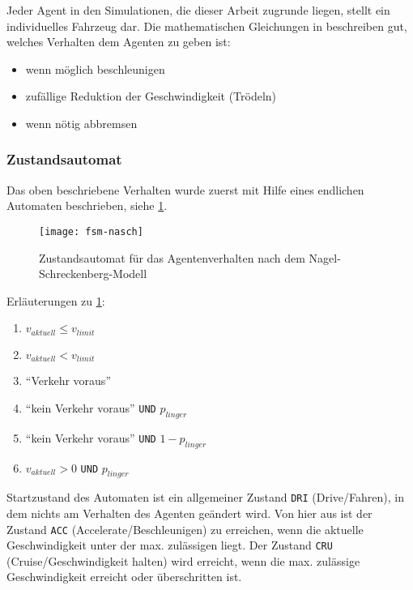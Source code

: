 Jeder Agent in den Simulationen, die dieser Arbeit zugrunde liegen, stellt ein individuelles Fahrzeug dar.
Die mathematischen Gleichungen in \cite{na-sch} beschreiben gut, welches Verhalten dem Agenten zu geben ist: 
\begin{itemize}
\itemsep0em
	\item wenn möglich beschleunigen
	\item zufällige Reduktion der Geschwindigkeit (Trödeln)
	\item wenn nötig abbremsen
\end{itemize}


\subsubsection{Zustandsautomat}

Das oben beschriebene Verhalten wurde zuerst mit Hilfe eines endlichen Automaten beschrieben, siehe \cref{figure:fsm-nasch}.

\begin{figure}[hptb]
 \centering
 \texttt{[image: fsm-nasch]}
 \caption[Zustandsautomat für das Agentenverhalten]
 		{Zustandsautomat für das Agentenverhalten nach dem Nagel-Schreckenberg-Modell}
 \label{figure:fsm-nasch}
\end{figure}

\noindent
Erläuterungen zu \cref{figure:fsm-nasch}:
\begin{enumerate}
\itemsep0em
	\item  $ v_{aktuell}  \leq  v_{limit} $
	\item  $ v_{aktuell}  <  v_{limit} $
	\item  \enquote{Verkehr voraus}
	\item  \enquote{kein Verkehr voraus} \texttt{UND} $ p_{linger} $
	\item  \enquote{kein Verkehr voraus} \texttt{UND} $ 1 - p_{linger} $
	\item  $ v_{aktuell}  > 0 $ \texttt{UND} $ p_{linger} $
\end{enumerate}

Startzustand des Automaten ist ein allgemeiner Zustand \texttt{DRI} (Drive/Fahren), in dem nichts am Verhalten des Agenten geändert wird.
Von hier aus ist der Zustand \texttt{ACC} (Accelerate/Beschleunigen) zu erreichen, wenn die aktuelle Geschwindigkeit unter der max. zulässigen liegt. 
Der Zustand \texttt{CRU} (Cruise/Geschwindigkeit halten) wird erreicht, wenn die max. zulässige Geschwindigkeit erreicht oder überschritten ist.

